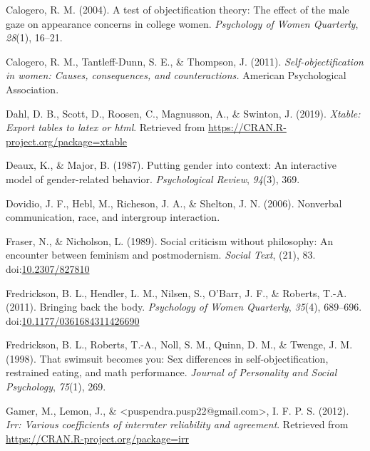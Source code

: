 \documentclass[
  man]{apa6}
\begin{document}
\leavevmode\hypertarget{ref-calogero2004test}{}%
Calogero, R. M. (2004). A test of objectification theory: The effect of the male gaze on appearance concerns in college women. \emph{Psychology of Women Quarterly}, \emph{28}(1), 16--21.

\leavevmode\hypertarget{ref-calogero2011}{}%
Calogero, R. M., Tantleff-Dunn, S. E., \& Thompson, J. (2011). \emph{Self-objectification in women: Causes, consequences, and counteractions.} American Psychological Association.

\leavevmode\hypertarget{ref-R-xtable}{}%
Dahl, D. B., Scott, D., Roosen, C., Magnusson, A., \& Swinton, J. (2019). \emph{Xtable: Export tables to latex or html}. Retrieved from \url{https://CRAN.R-project.org/package=xtable}

\leavevmode\hypertarget{ref-deaux1987putting}{}%
Deaux, K., \& Major, B. (1987). Putting gender into context: An interactive model of gender-related behavior. \emph{Psychological Review}, \emph{94}(3), 369.

\leavevmode\hypertarget{ref-dovidio2006nonverbal}{}%
Dovidio, J. F., Hebl, M., Richeson, J. A., \& Shelton, J. N. (2006). Nonverbal communication, race, and intergroup interaction.

\leavevmode\hypertarget{ref-frasernicholson1989}{}%
Fraser, N., \& Nicholson, L. (1989). Social criticism without philosophy: An encounter between feminism and postmodernism. \emph{Social Text}, (21), 83. doi:\href{https://doi.org/10.2307/827810}{10.2307/827810}

\leavevmode\hypertarget{ref-fredricksonetal2011}{}%
Fredrickson, B. L., Hendler, L. M., Nilsen, S., O'Barr, J. F., \& Roberts, T.-A. (2011). Bringing back the body. \emph{Psychology of Women Quarterly}, \emph{35}(4), 689--696. doi:\href{https://doi.org/10.1177/0361684311426690}{10.1177/0361684311426690}

\leavevmode\hypertarget{ref-fredrickson1998swimsuit}{}%
Fredrickson, B. L., Roberts, T.-A., Noll, S. M., Quinn, D. M., \& Twenge, J. M. (1998). That swimsuit becomes you: Sex differences in self-objectification, restrained eating, and math performance. \emph{Journal of Personality and Social Psychology}, \emph{75}(1), 269.

\leavevmode\hypertarget{ref-R-irr}{}%
Gamer, M., Lemon, J., \& \textless puspendra.pusp22@gmail.com\textgreater, I. F. P. S. (2012). \emph{Irr: Various coefficients of interrater reliability and agreement}. Retrieved from \url{https://CRAN.R-project.org/package=irr}
\end{document}
